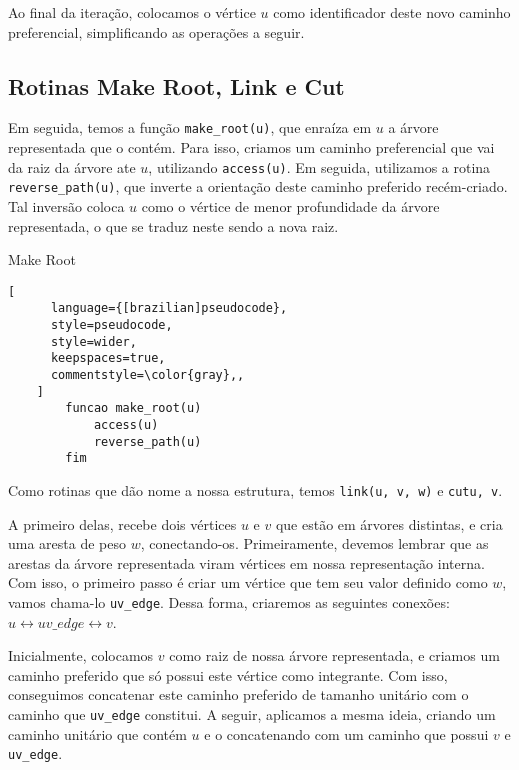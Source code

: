 Ao final da iteração, colocamos o vértice $u$ como identificador deste novo caminho preferencial, simplificando as operações a seguir.

\subsection{Rotinas Make Root, Link e Cut}
\label{subsection:lct-make-root}

Em seguida, temos a função \texttt{make\_root(u)}, que enraíza em $u$ a árvore representada que o contém. Para isso, criamos um caminho preferencial que vai da raiz da árvore ate $u$, utilizando \texttt{access(u)}. Em seguida, utilizamos a rotina \texttt{reverse\_path(u)}, que inverte a orientação deste caminho preferido recém-criado. Tal inversão coloca $u$ como o vértice de menor profundidade da árvore representada, o que se traduz neste sendo a nova raiz.

\begin{programruledcaption}{Make Root\label{lct:make-root}}
    \begin{lstlisting}[
      language={[brazilian]pseudocode},
      style=pseudocode,
      style=wider,
      keepspaces=true,
      commentstyle=\color{gray},,
    ]
        funcao make_root(u)
            access(u)
            reverse_path(u)
        fim
    \end{lstlisting}
\end{programruledcaption}

Como rotinas que dão nome a nossa estrutura, temos \texttt{link(u, v, w)} e \texttt{cut{u, v}}.

A primeiro delas, recebe dois vértices $u$ e $v$ que estão em árvores distintas, e cria uma aresta de peso $w$, conectando-os. Primeiramente, devemos lembrar que as arestas da árvore representada viram vértices em nossa representação interna. Com isso, o primeiro passo é criar um vértice que tem seu valor definido como $w$, vamos chama-lo \texttt{uv\_edge}. Dessa forma, criaremos as seguintes conexões: $u \leftrightarrow uv\_edge \leftrightarrow v$.

Inicialmente, colocamos $v$ como raiz de nossa árvore representada, e criamos um caminho preferido que só possui este vértice como integrante. Com isso, conseguimos concatenar este caminho preferido de tamanho unitário com o caminho que \texttt{uv\_edge} constitui. A seguir, aplicamos a mesma ideia, criando um caminho unitário que contém $u$ e o concatenando com um caminho que possui $v$ e \texttt{uv\_edge}.

